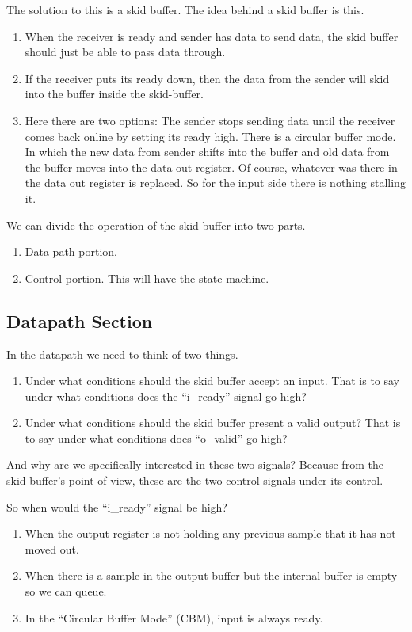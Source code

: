 The solution to this is a skid buffer. The idea behind a skid buffer is this.
\begin{enumerate}
	\item When the receiver is ready and sender has data to send data, the skid buffer should just be able to pass data through.
	\item If the receiver puts its ready down, then the data from the sender will skid into the buffer inside the skid-buffer.
	\item Here there are two options:
		\subitem The sender stops sending data until the receiver comes back online by setting its ready high. 
		\subitem There is a circular buffer mode. In which the new data from sender shifts into the buffer and old data from the buffer moves into the data out register. Of course, whatever was there in the data out register is replaced. So for the input side there is nothing stalling it. 
\end{enumerate}

We can divide the operation of the skid buffer into two parts.
\begin{enumerate}
	\item Data path portion.
	\item Control portion. This will have the state-machine.
\end{enumerate}

\subsection{Datapath Section}

In the datapath we need to think of two things. 
\begin{enumerate}
	\item Under what conditions should the skid buffer accept an input. That is to say under what conditions does the ``i\_ready'' signal go high?
	\item Under what conditions should the skid buffer present a valid output? That is to say under what conditions does ``o\_valid'' go high?
\end{enumerate}

And why are we specifically interested in these two signals? Because from the skid-buffer's point of view, these are the two control signals under its control. 

So when would the ``i\_ready'' signal be high?
\begin{enumerate}
	\item When the output register is not holding any previous sample that it has not moved out.
	\item When there is a sample in the output buffer but the internal buffer is empty so we can queue.
	\item In the ``Circular Buffer Mode'' (CBM), input is always ready.
\end{enumerate}

